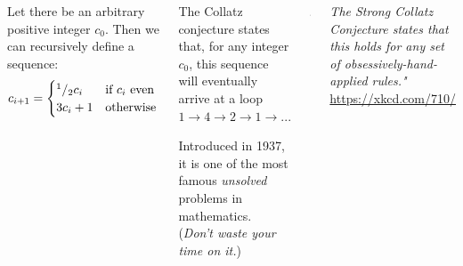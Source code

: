 \begin{frame}
%
\begin{columns}[T]
\begin{defbox}
\small
Let there be an arbitrary positive integer $c_0$. Then we can recursively define a sequence:
\begin{align*}
	c_{i+1} = \begin{cases}
	{}^{1}/_{2} c_i & \text{if~} c_i \text{~even}\\
	3 c_i + 1 & \text{otherwise}
	\end{cases}
\end{align*}
\end{defbox}
%
\begin{hintbox}
\small
The Collatz conjecture states that, for any integer $c_0$, this sequence will eventually arrive at a loop $1 \to 4 \to 2 \to 1 \to ...$

Introduced in 1937, it is one of the most famous \emph{unsolved} problems in mathematics.\\
(\Thus \emph{Don't waste your time on it.})
\end{hintbox}
%
\includegraphics[width=.9\linewidth]{./gfx/08-xkcd-collatz}

\footnotesize
\emph{The Strong Collatz Conjecture states that this holds for any set of obsessively-hand-applied rules."}\\
\url{https://xkcd.com/710/}
\end{columns}
%
\end{frame}

